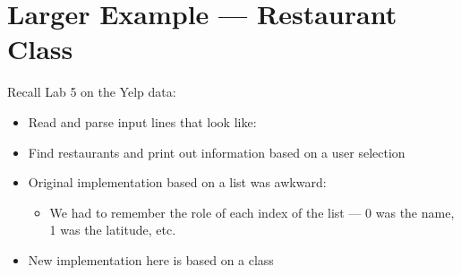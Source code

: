\documentclass[letterpaper,10pt,english]{sphinxmanual}
\begin{document}
\section{Larger Example — Restaurant Class}
\label{\detokenize{lecture_notes/lec19_classes2:larger-example-restaurant-class}}
Recall Lab 5 on the Yelp data:
\begin{itemize}
\item {} 
Read and parse input lines that look like:

%
\begin{sphinxVerbatim}[commandchars=\\\{\}]
      \PYGZbs{}
\end{sphinxVerbatim}

\item {} 
Find restaurants and print out information based on a user selection

\item {} 
Original implementation based on a list was awkward:
\begin{itemize}
\item {} 
We had to remember the role of each index of the list — 0 was the
name, 1 was the latitude, etc.

\end{itemize}

\item {} 
New implementation here is based on a class

\end{itemize}
\end{document}
